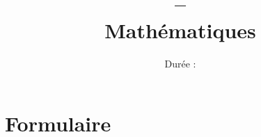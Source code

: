 \documentclass[a4paper,12pt]{scrartcl}
\date{}
\title{\textbf{\typedevoir{} -- \classe{}\writecorrword{} \\   
Mathématiques}}
\author{Durée : \duree{}}
\begin{document}
 
\maketitle







  

 


 
\section*{Formulaire}

 

 




\end{document}
